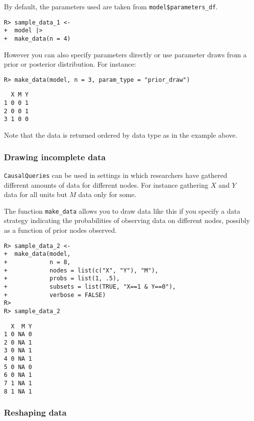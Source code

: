 \documentclass[
  11pt,
  article]{jss}
\begin{document}
By default, the parameters used are taken from
\texttt{model\$parameters\_df}.

\begin{verbatim}
R> sample_data_1 <- 
+  model |> 
+  make_data(n = 4)
\end{verbatim}

However you can also specify parameters directly or use parameter draws
from a prior or posterior distribution. For instance:

\begin{verbatim}
R> make_data(model, n = 3, param_type = "prior_draw")
\end{verbatim}

\begin{verbatim}
  X M Y
1 0 0 1
2 0 0 1
3 1 0 0
\end{verbatim}

Note that the data is returned ordered by data type as in the example
above.

\hypertarget{drawing-incomplete-data}{%
\subsubsection{Drawing incomplete data}\label{drawing-incomplete-data}}

\texttt{CausalQueries} can be used in settings in which researchers have
gathered different amounts of data for different nodes. For instance
gathering \(X\) and \(Y\) data for all units but \(M\) data only for
some.

The function \texttt{make\_data} allows you to draw data like this if
you specify a data strategy indicating the probabilities of observing
data on different nodes, possibly as a function of prior nodes observed.

\begin{verbatim}
R> sample_data_2 <-
+  make_data(model,
+            n = 8,
+            nodes = list(c("X", "Y"), "M"),
+            probs = list(1, .5),
+            subsets = list(TRUE, "X==1 & Y==0"),
+            verbose = FALSE)
R> 
R> sample_data_2
\end{verbatim}

\begin{verbatim}
  X  M Y
1 0 NA 0
2 0 NA 1
3 0 NA 1
4 0 NA 1
5 0 NA 0
6 0 NA 1
7 1 NA 1
8 1 NA 1
\end{verbatim}

\hypertarget{reshaping-data}{%
\subsubsection{Reshaping data}\label{reshaping-data}}
\end{document}
